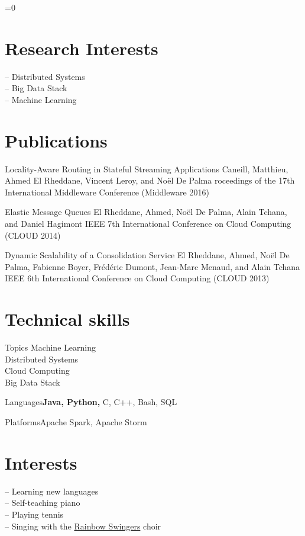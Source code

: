 \documentclass{mytccv}
\begin{document}
\vspace{\fill}

\ifnum{}=0
\section{Research Interests}
-- Distributed Systems\medskip\\
-- Big Data Stack\medskip\\
-- Machine Learning

\vspace{\fill}

\section{Publications}
\begin{publicationlist}
\item{Locality-Aware Routing in Stateful Streaming Applications}
     {Caneill, Matthieu, Ahmed El Rheddane, Vincent Leroy, and Noël De Palma}
     {roceedings of the 17th International Middleware Conference (Middleware 2016)}
\item{Elastic Message Queues}
     {El Rheddane, Ahmed, Noël De Palma, Alain Tchana, and Daniel Hagimont}
     {IEEE 7th International Conference on Cloud Computing (CLOUD 2014)}
\item{Dynamic Scalability of a Consolidation Service}
     {El Rheddane, Ahmed, Noël De Palma, Fabienne Boyer, Frédéric Dumont, Jean-Marc Menaud, and Alain Tchana}
     {IEEE 6th International Conference on Cloud Computing (CLOUD 2013)}
\end{publicationlist}

\vspace{-\bigskipamount}

\else
\section{Technical skills}
\begin{factlist}
\item{Topics}{
Machine Learning\medskip\\
Distributed Systems\medskip\\
Cloud Computing\medskip\\
Big Data Stack}
\item{Languages}{\textbf{Java, Python,} C, C++, Bash, SQL}
\item{Platforms}{Apache Spark, Apache Storm}
\end{factlist}

\vspace{\fill}

\section{Interests}
-- Learning new languages\medskip\\
-- Self-teaching piano\medskip\\
-- Playing tennis\medskip\\
-- Singing with the \href{https://www.rainbowswingers.net/}{Rainbow Swingers} choir
\fi
\end{document}
